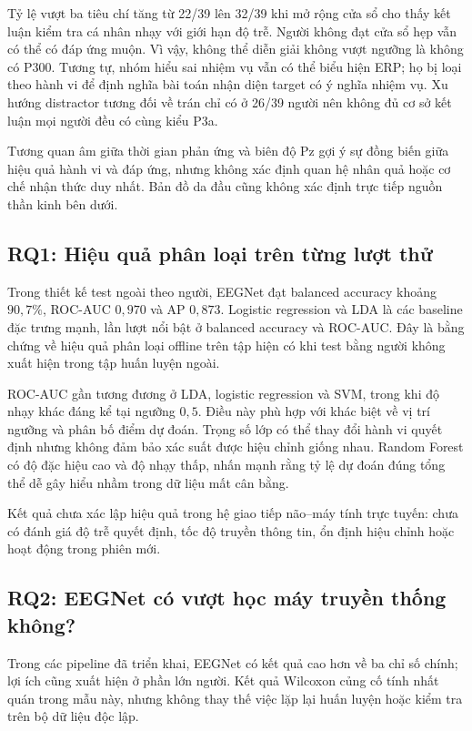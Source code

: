 \documentclass[11pt,a4paper]{article}
\begin{document}
Tỷ lệ vượt ba tiêu chí tăng từ 22/39 lên 32/39 khi mở rộng cửa sổ cho thấy kết luận kiểm tra cá nhân nhạy với giới hạn độ trễ. Người không đạt cửa sổ hẹp vẫn có thể có đáp ứng muộn. Vì vậy, không thể diễn giải không vượt ngưỡng là không có P300. Tương tự, nhóm hiểu sai nhiệm vụ vẫn có thể biểu hiện ERP; họ bị loại theo hành vi để định nghĩa bài toán nhận diện target có ý nghĩa nhiệm vụ. Xu hướng distractor tương đối về trán chỉ có ở 26/39 người nên không đủ cơ sở kết luận mọi người đều có cùng kiểu P3a.

Tương quan âm giữa thời gian phản ứng và biên độ Pz gợi ý sự đồng biến giữa hiệu quả hành vi và đáp ứng, nhưng không xác định quan hệ nhân quả hoặc cơ chế nhận thức duy nhất. Bản đồ da đầu cũng không xác định trực tiếp nguồn thần kinh bên dưới.

\subsection{RQ1: Hiệu quả phân loại trên từng lượt thử}
Trong thiết kế test ngoài theo người, EEGNet đạt balanced accuracy khoảng $90{,}7\%$, ROC-AUC $0{,}970$ và AP $0{,}873$. Logistic regression và LDA là các baseline đặc trưng mạnh, lần lượt nổi bật ở balanced accuracy và ROC-AUC. Đây là bằng chứng về hiệu quả phân loại offline trên tập hiện có khi test bằng người không xuất hiện trong tập huấn luyện ngoài.

ROC-AUC gần tương đương ở LDA, logistic regression và SVM, trong khi độ nhạy khác đáng kể tại ngưỡng $0{,}5$. Điều này phù hợp với khác biệt về vị trí ngưỡng và phân bố điểm dự đoán. Trọng số lớp có thể thay đổi hành vi quyết định nhưng không đảm bảo xác suất được hiệu chỉnh giống nhau. Random Forest có độ đặc hiệu cao và độ nhạy thấp, nhấn mạnh rằng tỷ lệ dự đoán đúng tổng thể dễ gây hiểu nhầm trong dữ liệu mất cân bằng.

Kết quả chưa xác lập hiệu quả trong hệ giao tiếp não--máy tính trực tuyến: chưa có đánh giá độ trễ quyết định, tốc độ truyền thông tin, ổn định hiệu chỉnh hoặc hoạt động trong phiên mới.

\subsection{RQ2: EEGNet có vượt học máy truyền thống không?}
Trong các pipeline đã triển khai, EEGNet có kết quả cao hơn về ba chỉ số chính; lợi ích cũng xuất hiện ở phần lớn người. Kết quả Wilcoxon củng cố tính nhất quán trong mẫu này, nhưng không thay thế việc lặp lại huấn luyện hoặc kiểm tra trên bộ dữ liệu độc lập.
\end{document}
